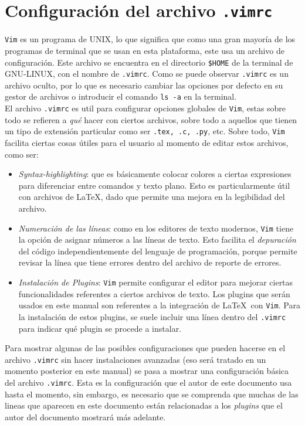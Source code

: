 \documentclass[10pt]{article}
\begin{document}
\section{Configuración del archivo \texttt{.vimrc}}
\texttt{Vim} es un programa de UNIX, lo que significa que como una gran mayoría de los programas de terminal que se usan en esta plataforma, este usa un archivo de configuración. Este archivo se encuentra en el directorio \texttt{\$HOME} de la terminal de GNU-LINUX, con el nombre de \texttt{.vimrc}. 
Como se puede observar \texttt{.vimrc} es un archivo oculto, por lo que es necesario cambiar las opciones por defecto en su gestor de archivos o introducir el comando \texttt{ls -a} en la terminal. \\
El archivo \texttt{.vimrc} es util para configurar opciones globales de \texttt{Vim}, estas sobre todo se refieren a \textit{qué} hacer con ciertos archivos, sobre todo a aquellos que tienen un tipo de extensión particular como ser \texttt{.tex, .c, .py}, etc. Sobre todo, \texttt{Vim} facilita ciertas cosas útiles para el usuario al momento de editar estos archivos, como ser: 
\begin{itemize}
	\item \textit{Syntax-highlighting}:  que es básicamente colocar colores a ciertas expresiones para diferenciar entre comandos y texto plano. Esto es particularmente útil con archivos de \LaTeX, dado que permite una mejora en la legibilidad del archivo.
	\item \textit{Numeración de las líneas}: como en los editores de texto modernos, \texttt{Vim} tiene la opción de asignar números a las líneas de texto. Esto facilita el \textit{depuración} del código independientemente del lenguaje de programación, porque permite revisar la línea que tiene errores dentro del archivo de reporte de errores. 
	\item \textit{Instalación de Plugins}: \texttt{Vim} permite configurar el editor para mejorar ciertas funcionalidades referentes a ciertos archivos de texto. Los plugins que serán usados en este manual son referentes a la integración de \LaTeX \ con \texttt{Vim}. Para la instalación de estos plugins, se suele incluir una línea dentro del \texttt{.vimrc} para indicar qué plugin se procede a instalar.  
\end{itemize}
Para mostrar algunas de las posibles configuraciones que pueden hacerse en el archivo \texttt{.vimrc} sin hacer instalaciones avanzadas (eso será tratado en un momento posterior en este manual) se pasa a mostrar una configuración básica del archivo \texttt{.vimrc}. 
Esta es la configuración que el autor de este documento usa hasta el momento, sin embargo, es necesario que se comprenda que muchas de las lineas que aparecen en este documento están relacionadas a los \textit{plugins} que el autor del documento mostrará más adelante.
\newpage
\end{document}
